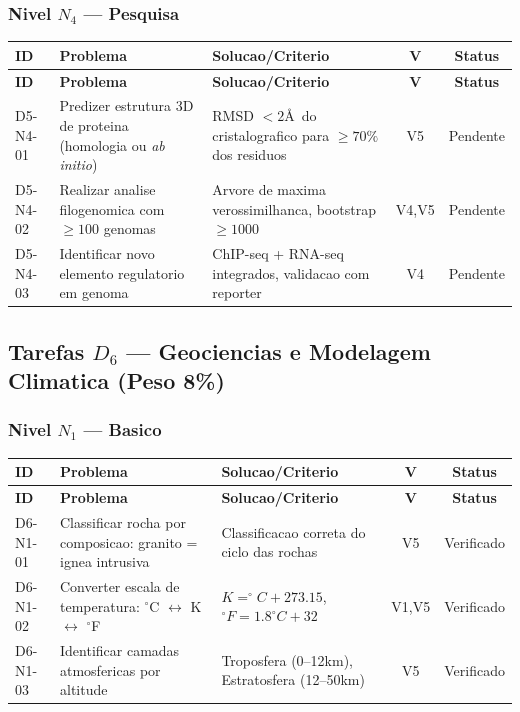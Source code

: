\subsubsection{Nivel $N_4$ --- Pesquisa}

\begin{longtable}{|p{2.0cm}|p{4.2cm}|p{4.2cm}|c|c|}
\hline
\textbf{ID} & \textbf{Problema} & \textbf{Solucao/Criterio} & \textbf{V} & \textbf{Status} \\
\hline
\endfirsthead
\hline
\textbf{ID} & \textbf{Problema} & \textbf{Solucao/Criterio} & \textbf{V} & \textbf{Status} \\
\hline
\endhead
\hline
\endfoot
D5-N4-01 & Predizer estrutura 3D de proteina (homologia ou \textit{ab initio}) & RMSD $<2$\AA\ do cristalografico para $\geq 70\%$ dos residuos & V5 & Pendente \\
\hline
D5-N4-02 & Realizar analise filogenomica com $\geq 100$ genomas & Arvore de maxima verossimilhanca, bootstrap $\geq 1000$ & V4,V5 & Pendente \\
\hline
D5-N4-03 & Identificar novo elemento regulatorio em genoma & ChIP-seq + RNA-seq integrados, validacao com reporter & V4 & Pendente \\
\hline
\end{longtable}

\subsection{Tarefas $D_6$ --- Geociencias e Modelagem Climatica (Peso 8\%)}

\subsubsection{Nivel $N_1$ --- Basico}

\begin{longtable}{|p{2.0cm}|p{4.2cm}|p{4.2cm}|c|c|}
\hline
\textbf{ID} & \textbf{Problema} & \textbf{Solucao/Criterio} & \textbf{V} & \textbf{Status} \\
\hline
\endfirsthead
\hline
\textbf{ID} & \textbf{Problema} & \textbf{Solucao/Criterio} & \textbf{V} & \textbf{Status} \\
\hline
\endhead
\hline
\endfoot
D6-N1-01 & Classificar rocha por composicao: granito = ignea intrusiva & Classificacao correta do ciclo das rochas & V5 & Verificado \\
\hline
D6-N1-02 & Converter escala de temperatura: $^{\circ}$C $\leftrightarrow$ K $\leftrightarrow$ $^{\circ}$F & $K=^{\circ}C+273.15$, $^{\circ}F=1.8^{\circ}C+32$ & V1,V5 & Verificado \\
\hline
D6-N1-03 & Identificar camadas atmosfericas por altitude & Troposfera (0--12km), Estratosfera (12--50km) & V5 & Verificado \\
\hline
\end{longtable}

